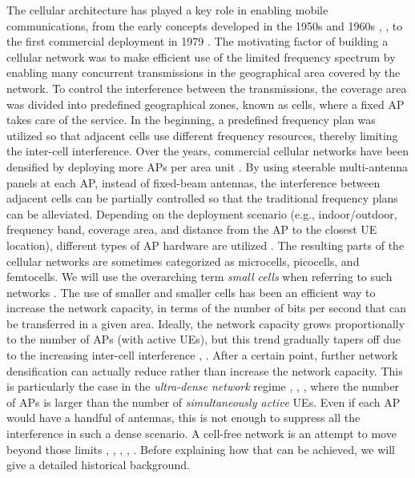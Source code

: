 The cellular architecture has played a key role in enabling mobile communications, from the early concepts developed in the 1950s and 1960s \cite{Bullington1953a}, \cite{Frefkiel1970a}, \cite{Schulte1960a} to the first commercial deployment in 1979 \cite{Kinoshita2018a}.
The motivating factor of building a cellular network was to make efficient use of the limited frequency spectrum by enabling many concurrent transmissions in the geographical area covered by the network. To control the interference between the transmissions, the coverage area was divided into predefined geographical zones, known as cells, where a fixed \gls{AP} takes care of the service. In the beginning, a predefined frequency plan was utilized so that adjacent cells use different frequency resources, thereby limiting the inter-cell interference. Over the years, commercial cellular networks have been densified by deploying more \glspl{AP} per area unit \cite{Cooper2010a}. By using steerable multi-antenna panels at each \gls{AP}, instead of fixed-beam antennas, the interference between adjacent cells can be partially controlled so that the traditional frequency plans can be alleviated. 
Depending on the deployment scenario (e.g., indoor/outdoor, frequency band, coverage area, and distance from the AP to the closest UE location), different types of AP hardware are utilized \cite{Kamel2016a}. The resulting parts of the cellular networks are sometimes categorized as microcells, picocells, and femtocells. We will use the overarching term \emph{small cells} when referring to such networks \cite{Hoydis2011c}.
The use of smaller and smaller cells has been an efficient way to increase the network capacity, in terms of the number of bits per second that can be transferred in a given area. 
Ideally, the network capacity grows proportionally to the number of \glspl{AP} (with active \glspl{UE}), but this trend gradually tapers off due to the increasing inter-cell interference \cite{Andrews2017a}, \cite{Zhou2003a}. After a certain point, further network densification can actually reduce rather than increase the network capacity. 
This is particularly the case in the \emph{ultra-dense network} regime \cite{Hwang2013a}, \cite{Kamel2016a}, \cite{Stefanatos2014a}, where the number of \glspl{AP} is larger than the number of \emph{simultaneously active} \glspl{UE}. Even if each \gls{AP} would have a handful of antennas, this is not enough to suppress all the interference in such a dense scenario.
A cell-free network is an attempt to move beyond those limits \cite{Chen2016a}, \cite{Interdonato2018}, \cite{Ngo2017b}, \cite{Zhang2020a}, \cite{Zhang2019a}. Before explaining how that can be achieved, we will give a detailed historical background.


